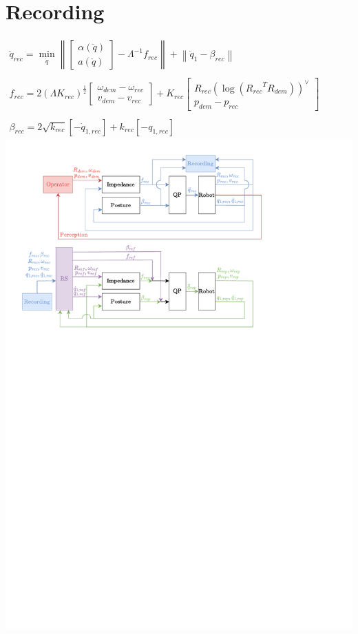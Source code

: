 \documentclass[11pt]{report}
\numberwithin{equation}{section}        %
\numberwithin{figure}{section}          %
\numberwithin{table}{section}           %
\begin{document}
\section*{Recording}

$\begin{array}{l}
\ddot{q}_{rec} = \min\limits_{\ddot{q}}\left \|  \begin{bmatrix}
\alpha(\ddot{q})\\ 
a(\ddot{q})
\end{bmatrix} - \Lambda^{-1}f_{rec} \right \| + \left \| \ddot{q}_1-\beta_{rec} \right \|\\\\
f_{rec} =2(\Lambda K_{rec})^{\frac{1}{2}} \begin{bmatrix}
\omega_{dem} - \omega_{rec}
\\ 
v_{dem}-v_{rec}
\end{bmatrix} + K_{rec} \begin{bmatrix}
R_{rec}(\log({R_{rec}}^TR_{dem}))^{\vee }\\ 
p_{dem}-p_{rec}
\end{bmatrix}\\\\
\beta_{rec} = 2\sqrt{k_{rec}}\left [ -\dot{q}_{1,rec}  \right ] + k_{rec}\left [ -q_{1,rec}  \right ]

\end{array}$\\
\includegraphics[trim={1cm 23.3cm 5cm 1cm}, clip]{Graphics/qp.pdf}\\
\end{document}
